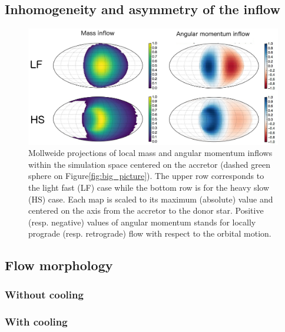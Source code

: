 \documentclass[a4paper,fleqn,usenatbib]{mnras}
\begin{document}
\subsection{Inhomogeneity and asymmetry of the inflow}
\label{sec:asymm}

\begin{figure}
\centering
\includegraphics[width=2\columnwidth]{Pictures/inflow_maps.png}
\caption{Mollweide projections of local mass and angular momentum inflows within the simulation space centered on the accretor (dashed green sphere on Figure\ref{fig:big_picture}). The upper row corresponds to the light fast (LF) case while the bottom row is for the heavy slow (HS) case. Each map is scaled to its maximum (absolute) value and centered on the axis from the accretor to the donor star. Positive (resp. negative) values of angular momentum stands for locally prograde (resp. retrograde) flow with respect to the orbital motion.}
\label{fig:inflow_maps}
\end{figure} 

\subsection{Flow morphology}
\label{sec:morph}

\subsubsection{Without cooling}
\label{sec:cool_F}

\subsubsection{With cooling}
\label{sec:cool_T}
\end{document}
